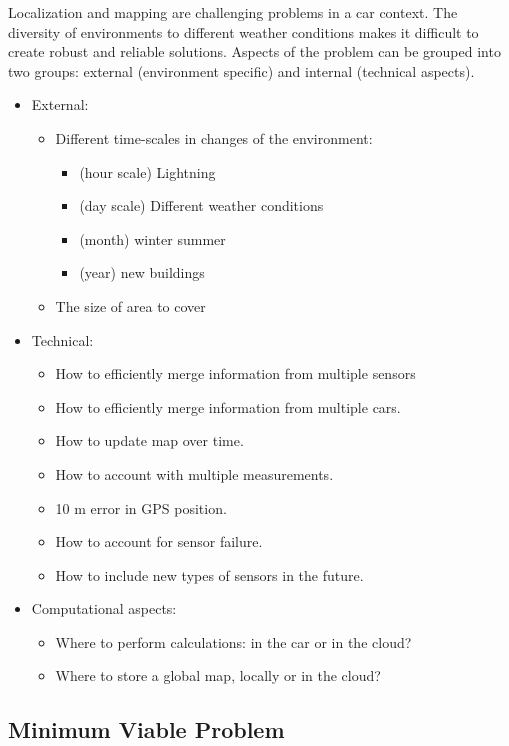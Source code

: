 Localization and mapping are challenging problems in a car context. The diversity of environments to different weather conditions makes it difficult to create robust and reliable solutions. Aspects of the problem can
be grouped into two groups: external (environment specific) and
internal (technical aspects).
\begin{itemize}
\item External:
  \begin{itemize}
  \item Different time-scales in changes of the environment:
    \begin{itemize}
    \item (hour scale) Lightning
    \item (day scale) Different weather conditions
    \item (month) winter summer
    \item (year) new buildings
    \end{itemize}
  \item The size of area to cover
  \end{itemize}
\item Technical:
  \begin{itemize}
  \item  How to efficiently merge information from multiple
    sensors
  \item  How to efficiently merge information from multiple cars.
  \item  How to update map over time.
  \item How to account with multiple measurements.
  \item  10 m error in GPS position.
  \item  How to account for sensor failure.
  \item  How to include new types of sensors in the future.
  \end{itemize}
\item  Computational aspects:
  \begin{itemize}
  \item   Where to perform calculations: in the car or in the
    cloud?
  \item   Where to store a global map, locally or in the cloud?
 \end{itemize}
\end{itemize}


\subsection{Minimum Viable Problem}

